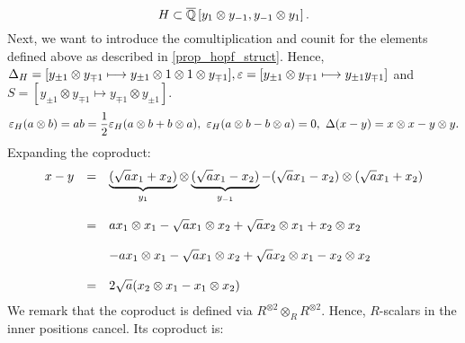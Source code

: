 $$H \subset \currfield\left[y_1\otimes y_{-1},y_{-1} \otimes y_1\right].$$
Next, we want to introduce the comultiplication and counit for the elements defined above as described in \ref{prop_hopf_struct}.%
Hence, $\Delta_H = [y_{\pm 1} \otimes y_{\mp 1} \longmapsto y_{\pm 1} \otimes 1 \otimes 1 \otimes y_{\mp 1}], \eps = [y_{\pm 1} \otimes y_{\mp 1} \longmapsto y_{\pm 1} y_{\mp 1}]$ and $S = [y_{\pm 1} \otimes y_{\mp 1} \longmapsto y_{\mp 1} \otimes y_{\pm 1}]$.
$$\eps_H(a \otimes b) = a b = \frac{1}{2}\eps_H(a \otimes b + b \otimes a),\ \eps_H(a \otimes b - b \otimes a) = 0,\ \Delta(x - y) = x\otimes x - y \otimes y.$$
Expanding the coproduct:
$$\bao{rcl}
x - y &=& \underbrace{(\sqrt{a} x_1 + x_2)}_{y_1} \otimes \underbrace{(\sqrt{a} x_1 - x_2)}_{y_{-1}} - (\sqrt{a} x_1 - x_2) \otimes (\sqrt{a} x_1 + x_2)\\
&&\\
&=& a x_1 \otimes x_1 - \sqrt{a} x_1 \otimes x_2 + \sqrt{a} x_2 \otimes x_1 + x_2 \otimes x_2 \\
&&\\
&& - a x_1 \otimes x_1 - \sqrt{a} x_1 \otimes x_2 + \sqrt{a} x_2 \otimes x_1 - x_2 \otimes x_2\\
&&\\
&=& 2 \sqrt{a} (x_2 \otimes x_1 - x_1 \otimes x_2)\\
\ea$$
We remark that the coproduct is defined via $R^{\otimes 2} \otimes_R R^{\otimes 2}$. Hence, $R$-scalars in the inner positions cancel. Its coproduct is:

